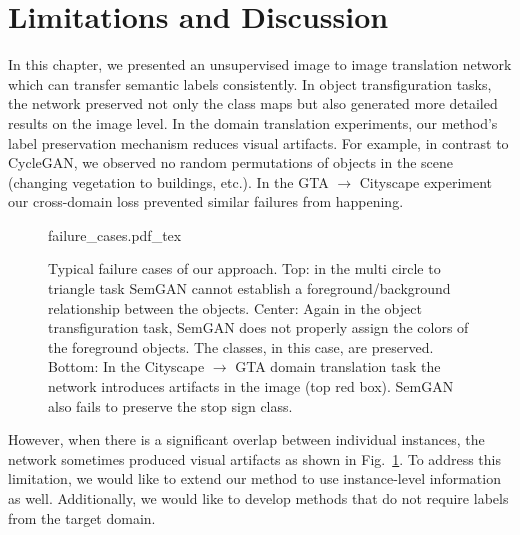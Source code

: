 \section{Limitations and Discussion}\label{sec:semgan_conc}

In this chapter, we presented an unsupervised image to image translation network which can transfer semantic labels consistently. In object transfiguration tasks, the network preserved not only the class maps but also generated more detailed results on the image level.
In the domain translation experiments, our method's label preservation mechanism reduces visual artifacts. For example, in contrast to CycleGAN, we observed no random permutations of objects in the scene (changing vegetation to buildings, etc.). In the GTA $\to$ Cityscape experiment our cross-domain loss prevented similar failures from happening.

\begin{figure}[!hbpt]
    \centering
    \def\svgwidth{\columnwidth}
    {failure_cases.pdf_tex}
    \caption[Typical failure cases of our approach.]{Typical failure cases of our approach. Top: in the multi circle to triangle task SemGAN cannot establish a foreground/background relationship between the objects. Center: Again in the object transfiguration task, SemGAN does not properly assign the colors of the foreground objects. The classes, in this case, are preserved. Bottom: In the Cityscape $\to$ GTA domain translation task the network introduces artifacts in the image (top red box). SemGAN also fails to preserve the stop sign class.}
    \label{fig:failure_cases}
\end{figure}

However, when there is a significant overlap between individual instances, the network sometimes produced visual artifacts as shown in Fig.~\ref{fig:failure_cases}.
To address this limitation, we would like to extend our method to use instance-level information as well. Additionally, we would like to develop methods that do not require labels from the target domain.